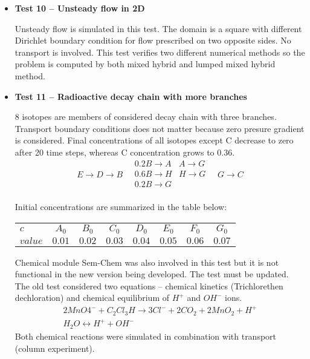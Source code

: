 \documentclass[12pt,a4paper]{report}
\begin{document}
\begin{itemize}

\item \textbf{Test 10 -- Unsteady flow in 2D}

Unsteady flow is simulated in this test. The domain is a square with different Dirichlet boundary condition for flow prescribed on two opposite sides. No transport is involved.
This test verifies two different numerical methods so the problem is computed by both mixed hybrid and lumped mixed hybrid method.



\item \textbf{Test 11 -- Radioactive decay chain with more branches}

8 isotopes are members of considered decay chain with three branches. Transport boundary conditions does not matter because zero presure gradient is considered. Final concentrations of all isotopes except C decrease to zero after 20 time steps, whereas C concentration grows to 0.36.
\[
 E\xrightarrow{}D\xrightarrow{}B
 \quad
 \begin{matrix}
    0.2B\xrightarrow{}A & A\xrightarrow{}G \\
    0.6B\xrightarrow{}H & H\xrightarrow{}G \\
    0.2B\xrightarrow{}G &\\
 \end{matrix}
 \quad
 G\xrightarrow{}C 
\]

Initial concentrations are summarized in the table below:
\begin{center}
  \begin{tabular}[c]{|l|c|c|c|c|c|c|c|}
      \hline
      $c$ & $A_0$ & $B_0$  & $C_0$ & $D_0$ & $E_0$ & $F_0$ & $G_0$ \\[4pt]
      $value$ & $0.01$ & $0.02$ & $0.03$ & $0.04$ & $0.05$ & $0.06$ & $0.07$\\[4pt]
      \hline
  \end{tabular}
\end{center}

Chemical module Sem-Chem was also involved in this test but it is not functional in the new version being developed. The test must be updated. The old test considered two equations -- chemical kinetics (Trichlorethen dechloration) and chemical equilibrium of $H^+$ and $OH^-$ ions.
\begin{eqnarray}
  2MnO4^- + C_2Cl_3H \longrightarrow 3Cl^- + 2CO_2 + 2MnO_2 + H^+\nonumber\\
  H_2O \longleftrightarrow H^+ + OH^-\nonumber
\end{eqnarray}
Both chemical reactions were simulated in combination with transport (column experiment).



\end{itemize}
\end{document}
